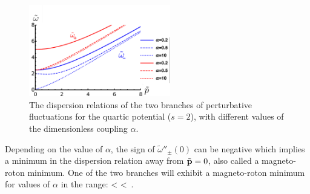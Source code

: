 \begin{figure}[h]
\begin{center}
    \includegraphics[width=0.55\textwidth]{Chapter_2_Folder_1912.11321/figures/Dispersion_relations-2.pdf}    
    \caption{{\small The dispersion relations of the two branches of perturbative fluctuations for the quartic potential ($s=2$), with different values of the dimensionless coupling $\alpha$.}} \label{fig:dispersion}
    \end{center}
\end{figure}
Depending on the value of $\alpha$, the sign of  $\tilde\omega''_{\pm}(0)$ can be negative which implies a minimum in the dispersion relation away from $\tilde{\bf p}=0$, also called a magneto-roton minimum. One  of the two branches  will exhibit a magneto-roton minimum  for values of $\alpha$ in the range:
\be
\quad{} < \alpha <  \,.
\ee

